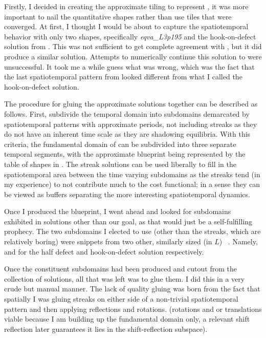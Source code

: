 \begin{description}
{\begin{description}
Firstly, I decided in creating the approximate tiling to represent
, it
was more important to nail the quantitative shapes rather than use tiles that were converged.
At first, I thought I would be about to capture the spatiotemporal behavior with only two
shapes, specifically \emph{eqva\_L3p195} and the hook-on-defect solution from .
This was not sufficient to get complete agreement with
, but it did produce a similar
solution. Attempts to numerically continue this solution to
were unsuccessful.
It took me a while guess what was wrong, which was the fact that the last spatiotemporal pattern
from
looked different from what I called the hook-on-defect solution.

The procedure for gluing the approximate solutions together can be described as follows.
First, subdivide the temporal domain into subdomains demarcated by spatiotemporal patterns with
approximate periods, not including streaks as they do not have an inherent time scale as they are
shadowing equilibria. With this criteria, the fundamental domain of
can
be subdivided into three separate temporal segments, with the approximate blueprint being
represented by the table of shapes in . The streak solutions
can be used liberally to fill in the spatiotemporal area between the time varying subdomains
as the streaks tend (in my experience) to not contribute much to the cost functional; in a
sense they can be viewed as buffers separating the more interesting spatiotemporal dynamics.

Once I produced the blueprint, I went ahead and looked for subdomains exhibited in solutions
other than our goal, as that would just be a self-fulfilling prophecy. The two subdomains I elected
to use (other than the streaks, which are relatively boring) were snippets from two other, similarly
sized (in $L$) \ppo\ \twots. Namely,
and
for the half
defect and hook-on-defect solution respectively.

Once the constituent subdomains had been produced and cutout from the collection of solutions,
all that was left was to glue them. I did this in a very crude but manual manner. The lack
of quality gluing was born from the fact that spatially I was gluing streaks on either side of
a non-trivial spatiotemporal pattern and then applying reflections and rotations. (rotations and or translations
viable because I am building up the fundamental domain only, a relevant shift reflection later
guarantees it lies in the shift-reflection subspace).


\end{description}}
\end{description}
